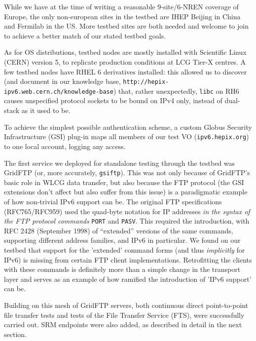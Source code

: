 While we have at the time of writing a reasonable
9-site/6-NREN coverage of Europe, the only non-european sites in the testbed
are IHEP Beijing in China and Fermilab in the US. More testbed sites are both needed and welcome to join 
to achieve a better match of our stated testbed goals.
\par
As for OS distributions, testbed nodes are mostly installed with 
Scientific Linux (CERN) version 5,
to replicate production conditions at LCG Tier-X centres. A few testbed nodes
have RHEL 6 derivatives installed: this allowed us to discover 
(and document in our knowledge base, {\tt http://hepix-ipv6.web.cern.ch/knowledge-base})
that, rather unexpectedly, {\tt libc} on RH6 causes unspecified 
protocol sockets to be bound on IPv4 only, instead of dual-stack 
as it used to be.
\par
To achieve the simplest possible authentication scheme, a custom Globus
Security Infrastructure (GSI)
plug-in maps all members of our test VO ({\tt ipv6.hepix.org}) to one
local account, logging any access. 
\par
The first service we deployed for standalone testing through the testbed was
GridFTP (or, more accurately, {\tt gsiftp}). 
This was not only because of GridFTP's basic role in WLCG data
transfer, but also because the FTP protocol (the GSI extensions don't 
affect but also suffer from this issue) is a paradigmatic example of 
how non-trivial IPv6 support can be. The original FTP specifications 
(RFC765/RFC959) used the quad-byte notation for IP addresses 
{\em in the syntax of the FTP protocol commands} {\tt PORT} and {\tt PASV}.
This required the introduction, with RFC 2428 (September 1998) of
``extended'' versions of the same commands, supporting different address
families, and IPv6 in particular. We found on our testbed that support for 
the 'extended' command forms (and thus {\em implicitly} for IPv6)
is missing from certain FTP client implementations. Retrofitting the
clients with these commands is definitely more than a simple change in
the transport layer and serves as an example of how ramified the
introduction of 'IPv6 support' can be.
\par
Building on this mesh of GridFTP servers, both continuous direct point-to-point 
file transfer tests and tests of the File Transfer Service 
(FTS), were successfully carried out. SRM endpoints
were also added, as described in detail in the next section.
